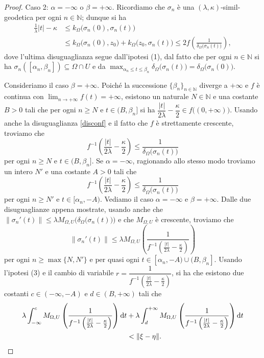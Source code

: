 \begin{proof}
    Caso 2: $\alpha=-\infty$ o $\beta=+\infty$. Ricordiamo che $\sigma_n$ è una $(\lambda,\kappa)$-simil-geodetica per ogni $n\in\mathbb{N}$; dunque si ha
    \begin{equation}\label{disconf}
        \begin{aligned}
            \frac{1}{\lambda}|t|-\kappa&\le k_\Omega\big(\sigma_n(0),\sigma_n(t)\big)\\
            &\le k_\Omega\big(\sigma_n(0),z_0\big)+k_\Omega\big(z_0,\sigma_n(t)\big) \le 2f\left(\frac{1}{\delta_\Omega\big(\sigma_n(t)\big)}\right),
        \end{aligned}
    \end{equation}
    dove l'ultima disuguaglianza segue dall'ipotesi (1), dal fatto che per ogni $n\in\mathbb{N}$ si ha $\sigma_n([\alpha_n,\beta_n])\subseteq\Omega\cap U$ e da $\displaystyle\max_{\alpha_n\le t\le \beta_n}\delta_\Omega\big(\sigma_n(t)\big)=\delta_\Omega\big(\sigma_n(0)\big)$.

    Consideriamo il caso $\beta=+\infty$. Poiché la successione $\{\beta_n\}_{n\in\mathbb{N}}$ diverge a $+\infty$ e $f$ è continua con $\displaystyle\lim_{n\longrightarrow+\infty}f(t)=+\infty$, esistono un naturale $N\in\mathbb{N}$ e una costante $B>0$ tali che per ogni $n\ge N$ e $t\in(B,\beta_n]$ si ha $\dfrac{|t|}{2\lambda}-\dfrac{\kappa}{2}\in f\big((0,+\infty)\big)$. Usando anche la disuguaglianza \eqref{disconf} e il fatto che $f$ è strettamente crescente, troviamo che
    $$f^{-1}\left(\frac{|t|}{2\lambda}-\frac{\kappa}{2}\right) \le \frac{1}{\delta_\Omega\big(\sigma_n(t)\big)}$$
    per ogni $n\ge N$ e $t\in(B,\beta_n]$. Se $\alpha=-\infty$, ragionando allo stesso modo troviamo un intero $N'$ e una costante $A>0$ tali che
    $$f^{-1}\left(\frac{|t|}{2\lambda}-\frac{\kappa}{2}\right) \le \frac{1}{\delta_\Omega\big(\sigma_n(t)\big)}$$
    per ogni $n\ge N'$ e $t\in[\alpha_n,-A)$. Vediamo il caso $\alpha=-\infty$ e $\beta=+\infty$. Dalle due disuguaglianze appena mostrate, usando anche che $\|\sigma_n'(t)\| \le \lambda M_{\Omega,U}\Big(\delta_\Omega\big(\sigma_n(t)\big)\Big)$ e che $M_{\Omega,U}$ è crescente, troviamo che
    $$\|\sigma_n'(t)\| \le \lambda M_{\Omega,U}\left(\frac{1}{f^{-1}\left(\frac{|t|}{2\lambda}-\frac{\kappa}{2}\right)}\right)$$
    per ogni $n\ge\max\{N,N'\}$ e per quasi ogni $t\in[\alpha_n,-A)\cup(B,\beta_n]$. Usando l'ipotesi (3) e il cambio di variabile $r=\dfrac{1}{f^{-1}\left(\frac{|t|}{2\lambda}-\frac{\kappa}{2}\right)}$, si ha che esistono due costanti $c\in(-\infty,-A)$ e $d\in(B,+\infty)$ tali che
    \begin{align*}
        \lambda\int_{-\infty}^c M_{\Omega,U}\left(\frac{1}{f^{-1}\left(\frac{|t|}{2\lambda}-\frac{\kappa}{2}\right)}\right)\mathop{}\!\mathrm{d} t&+\lambda\int_d^{+\infty}M_{\Omega,U}\left(\frac{1}{f^{-1}\left(\frac{|t|}{2\lambda}-\frac{\kappa}{2}\right)}\right)\mathop{}\!\mathrm{d} t\\
        &<\|\xi-\eta\|.
    \end{align*}


\end{proof}
